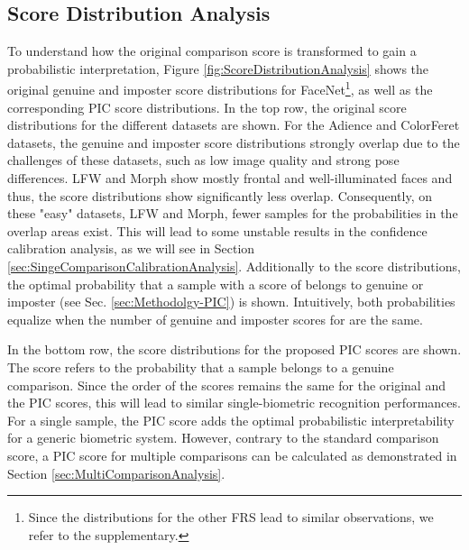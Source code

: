 \documentclass[10pt,twocolumn,letterpaper]{article}
\begin{document}
\subsection{Score Distribution Analysis}
\label{sec:ScoreDistributionAnalysis}

To understand how the original comparison score is transformed to gain a probabilistic interpretation, Figure \ref{fig:ScoreDistributionAnalysis} shows the original genuine and imposter score distributions for FaceNet\footnote{Since the distributions for the other FRS lead to similar observations, we refer to the supplementary.}, as well as the corresponding PIC score distributions.
In the top row, the original score distributions for the different datasets are shown.
For the Adience and ColorFeret datasets, the genuine and imposter score distributions strongly overlap due to the challenges of these datasets, such as low image quality and strong pose differences.
LFW and Morph show mostly frontal and well-illuminated faces and thus, the score distributions show significantly less overlap. 
Consequently, on these "easy" datasets, LFW and Morph, fewer samples for the probabilities in the overlap areas exist.
This will lead to some unstable results in the confidence calibration analysis, as we will see in Section \ref{sec:SingeComparisonCalibrationAnalysis}.
Additionally to the score distributions, the optimal probability that a sample with a score of  belongs to genuine or imposter (see Sec. \ref{sec:Methodolgy-PIC}) is shown. 
Intuitively, both probabilities equalize when the number of genuine and imposter scores for  are the same.

In the bottom row, the score distributions for the proposed PIC scores are shown.
The score refers to the probability that a sample belongs to a genuine comparison.
Since the order of the scores remains the same for the original and the PIC scores, this will lead to similar single-biometric recognition performances.
For a single sample, the PIC score adds the optimal probabilistic interpretability for a generic biometric system.
However, contrary to the standard comparison score, a PIC score for multiple comparisons can be calculated as demonstrated in Section \ref{sec:MultiComparisonAnalysis}.
\end{document}
